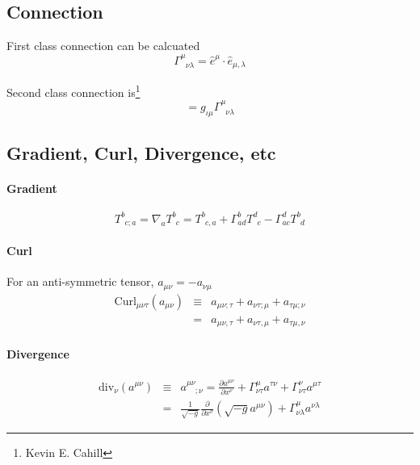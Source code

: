 \subsection{Connection}

First class connection can be calcuated 
\begin{equation}
\Gamma^\mu_{\phantom{\mu}\nu\lambda}=\hat e^\mu\cdot \hat e_{\mu,\lambda}
\end{equation}

Second class connection is\footnote{Kevin E. Cahill}
\begin{equation}
[\mu\nu,\iota]=g_{\iota\mu}\Gamma^\mu_{\phantom{\mu}\nu\lambda}
\end{equation}




\subsection{Gradient, Curl, Divergence, etc}

\paragraph{Gradient} 
\begin{equation}
T^b_{\phantom bc;a}= \nabla_aT^b_{\phantom bc}=T^b_{\phantom bc,a}+\Gamma^b_{ad}T^d_{\phantom dc}-\Gamma^d_{ac}T^b_{\phantom bd}
\end{equation}

\paragraph{Curl}For an anti-symmetric tensor, $a_{\mu\nu}=-a_{\nu\mu}$
\begin{eqnarray}
\mathrm{Curl}_{\mu\nu\tau}(a_{\mu\nu})&\equiv& a_{\mu\nu;\tau}+a_{\nu\tau;\mu}+a_{\tau\mu;\nu} \\
&=&a_{\mu\nu,\tau}+a_{\nu\tau,\mu}+a_{\tau\mu,\nu}
\end{eqnarray}

\paragraph{Divergence}

\begin{eqnarray}
\mathrm{div}_\nu(a^{\mu\nu})&\equiv& a^{\mu\nu}_{\phantom{\mu\nu};\nu}=\frac{\partial a^{\mu\nu}}{\partial x^\nu}+\Gamma^\mu_{\nu\tau}a^{\tau\nu}+\Gamma^\nu_{\nu\tau}a^{\mu\tau} \\
&=&\frac1{\sqrt{-g}}\frac{\partial}{\partial x^\nu}(\sqrt{-g}a^{\mu\nu})+\Gamma^\mu_{\nu\lambda}a^{\nu\lambda}
\end{eqnarray}

